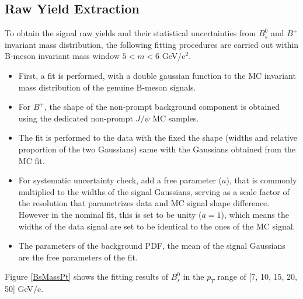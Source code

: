 \subsection{Raw Yield Extraction}


To obtain the signal raw yields and their statistical uncertainties from $B^0_s$ and $B^+$ invariant mass distribution, the following fitting procedures are carried out within B-meson invariant mass window $5 < m < 6$ GeV/c$^2$.

\begin{itemize}
\item First, a fit is performed, with a double gaussian function to the MC invariant mass distribution of the genuine B-meson signals.
\item For $B^+$, the shape of the non-prompt background component is obtained using the dedicated non-prompt $J/\psi$ MC samples.
\item The fit is performed to the data with the fixed the shape (widths and relative proportion of the two Gaussians) same with the Gaussians obtained from the MC fit.
\item For systematic uncertainty check, add a free parameter ($a$), that is commonly multiplied to the widths of the signal Gaussians, serving as a scale factor of the resolution that parametrizes data and MC signal shape difference. However in the nominal fit, this is set to be unity ($a = 1$), which means the widths of the data signal are set to be identical to the ones of the MC signal.
\item The parameters of the background PDF, the mean of the signal Gaussians are the free parameters of the fit.
\end{itemize}


Figure \ref{BsMassPt} shows the fitting results of $B^0_s$ in the $p_T$ range of [7, 10, 15, 20, 50] GeV/c.  


